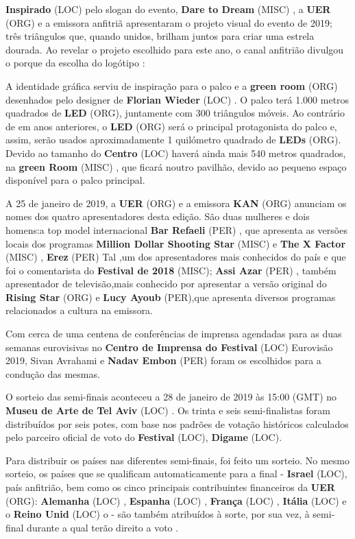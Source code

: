\documentclass[12pt,a4paper]{article}
\begin{document}
\textbf{Inspirado} (LOC) pelo slogan do evento, \textbf{Dare to Dream} (MISC) , a \textbf{UER} (ORG) e a emissora anfitriã apresentaram o projeto visual do evento de 2019; três triângulos que, quando unidos, brilham juntos para criar uma estrela dourada. Ao revelar o projeto escolhido para este ano, o canal anfitrião divulgou o porque da escolha do logótipo :

A identidade gráfica serviu de inspiração para o palco e a \textbf{green room} (ORG) desenhados pelo designer de \textbf{Florian Wieder} (LOC) . O palco terá 1.000 metros quadrados de \textbf{LED} (ORG), juntamente com 300 triângulos móveis. Ao contrário de em anos anteriores, o \textbf{LED} (ORG) será o principal protagonista do palco e, assim, serão usados aproximadamente 1 quilómetro quadrado de \textbf{LEDs} (ORG). Devido ao tamanho do \textbf{Centro} (LOC) haverá ainda mais 540 metros quadrados, na \textbf{green Room} (MISC) , que ficará noutro pavilhão, devido ao pequeno espaço disponível para o palco principal.

A 25 de janeiro de 2019, a \textbf{UER} (ORG) e a emissora \textbf{KAN} (ORG) anunciam os nomes dos quatro apresentadores desta edição. São duas mulheres e dois homens:a top model internacional \textbf{Bar Refaeli} (PER) , que apresenta as versões locais dos programas \textbf{Million Dollar Shooting Star} (MISC) e \textbf{The X Factor} (MISC) , \textbf{Erez} (PER) Tal ,um dos apresentadores mais conhecidos do país e que foi o comentarista do \textbf{Festival de 2018} (MISC); \textbf{Assi Azar} (PER) , também apresentador de televisão,mais conhecido por apresentar a versão original do \textbf{Rising Star} (ORG) e \textbf{Lucy Ayoub} (PER),que apresenta diversos programas relacionados a cultura na emissora.

Com cerca de uma centena de conferências de imprensa agendadas para as duas semanas eurovisivas no \textbf{Centro de Imprensa do Festival} (LOC) Eurovisão 2019, Sivan Avrahami e \textbf{Nadav Embon} (PER) foram os escolhidos para a condução das mesmas.

O sorteio das semi-finais aconteceu a 28 de janeiro de 2019 às 15:00 (GMT) no \textbf{Museu de Arte de Tel Aviv} (LOC) . Os trinta e seis semi-finalistas foram distribuídos por seis potes, com base nos padrões de votação históricos calculados pelo parceiro oficial de voto do \textbf{Festival} (LOC), \textbf{Digame} (LOC).

Para distribuir os países nas diferentes semi-finais, foi feito um sorteio. No mesmo sorteio, os países que se qualificam automaticamente para a final - \textbf{Israel} (LOC), país anfitrião, bem como os cinco principais contribuintes financeiros da \textbf{UER} (ORG): \textbf{Alemanha} (LOC) , \textbf{Espanha} (LOC) , \textbf{França} (LOC) , \textbf{Itália} (LOC) e o \textbf{Reino Unid} (LOC) o - são também atribuídos à sorte, por sua vez, à semi-final durante a qual terão direito a voto .
\end{document}
